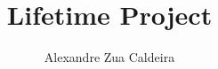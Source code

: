 \documentclass[a4paper]{report} \setcounter{secnumdepth}{5}
\title{Lifetime Project}%
\author{Alexandre Zua Caldeira}%
\begin{document}
\maketitle{}
\tableofcontents{}
\listoffigures{}
\listtheoremname{}
% 
%
%
%
\end{document}
